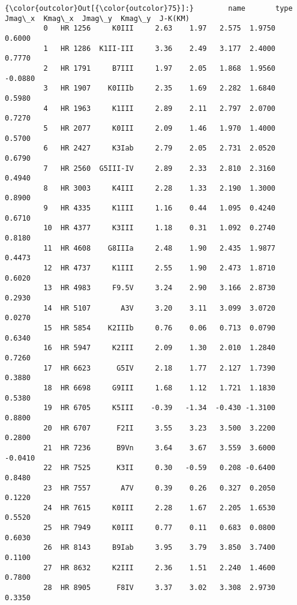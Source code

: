 \documentclass{article}
\begin{document}
            \begin{Verbatim}[commandchars=\\\{\}]
{\color{outcolor}Out[{\color{outcolor}75}]:}        name       type  Jmag\_x  Kmag\_x  Jmag\_y  Kmag\_y  J-K(KM)
         0   HR 1256     K0III     2.63    1.97   2.575  1.9750   0.6000
         1   HR 1286  K1II-III     3.36    2.49   3.177  2.4000   0.7770
         2   HR 1791     B7III     1.97    2.05   1.868  1.9560  -0.0880
         3   HR 1907    K0IIIb     2.35    1.69   2.282  1.6840   0.5980
         4   HR 1963     K1III     2.89    2.11   2.797  2.0700   0.7270
         5   HR 2077     K0III     2.09    1.46   1.970  1.4000   0.5700
         6   HR 2427     K3Iab     2.79    2.05   2.731  2.0520   0.6790
         7   HR 2560  G5III-IV     2.89    2.33   2.810  2.3160   0.4940
         8   HR 3003     K4III     2.28    1.33   2.190  1.3000   0.8900
         9   HR 4335     K1III     1.16    0.44   1.095  0.4240   0.6710
         10  HR 4377     K3III     1.18    0.31   1.092  0.2740   0.8180
         11  HR 4608    G8IIIa     2.48    1.90   2.435  1.9877   0.4473
         12  HR 4737     K1III     2.55    1.90   2.473  1.8710   0.6020
         13  HR 4983     F9.5V     3.24    2.90   3.166  2.8730   0.2930
         14  HR 5107       A3V     3.20    3.11   3.099  3.0720   0.0270
         15  HR 5854    K2IIIb     0.76    0.06   0.713  0.0790   0.6340
         16  HR 5947     K2III     2.09    1.30   2.010  1.2840   0.7260
         17  HR 6623      G5IV     2.18    1.77   2.127  1.7390   0.3880
         18  HR 6698     G9III     1.68    1.12   1.721  1.1830   0.5380
         19  HR 6705     K5III    -0.39   -1.34  -0.430 -1.3100   0.8800
         20  HR 6707      F2II     3.55    3.23   3.500  3.2200   0.2800
         21  HR 7236      B9Vn     3.64    3.67   3.559  3.6000  -0.0410
         22  HR 7525      K3II     0.30   -0.59   0.208 -0.6400   0.8480
         23  HR 7557       A7V     0.39    0.26   0.327  0.2050   0.1220
         24  HR 7615     K0III     2.28    1.67   2.205  1.6530   0.5520
         25  HR 7949     K0III     0.77    0.11   0.683  0.0800   0.6030
         26  HR 8143     B9Iab     3.95    3.79   3.850  3.7400   0.1100
         27  HR 8632     K2III     2.36    1.51   2.240  1.4600   0.7800
         28  HR 8905      F8IV     3.37    3.02   3.308  2.9730   0.3350
\end{Verbatim}
        
\end{document}
